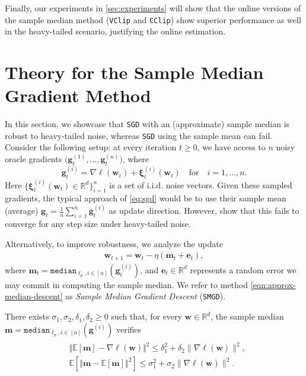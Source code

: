 \documentclass[10pt]{article} %
\renewcommand{\vec}[1]{\bm{#1}}
\newcommand{\bw}{\bm{w}}
\newcommand{\m}{\bm{m}}
\newcommand{\R}{\mathbb{R}}
\newcommand{\E}[1]{\mathbb{E}\left[#1\right] }
\newcommand{\samplemedian}[1]{\texttt{median}_{#1,i\in[n]}}
\newcommand{\SGD}{\texttt{SGD}}
\newcommand{\SMGD}{\texttt{SMGD}}
\newcommand{\VC}{\texttt{VClip}}
\newcommand{\CC}{\texttt{CClip}}
\begin{document}
Finally, our experiments in \cref{sec:experiments} will show that the online versions of the sample median method (\VC{} and \CC{}) show superior performance as well in the heavy-tailed scenario, justifying the online estimation. 


\section{Theory for the Sample Median Gradient Method}\label{sec:sample-median-methods}

In this section, we showcase that \SGD{} with an (approximate) sample median is robust to heavy-tailed noise, whereas \SGD{} using the sample mean can fail.
Consider the following setup: at every iteration $t \geq 0$, we have access to $n$ noisy oracle gradients $\big(\vec{g}_t^{(1)},\ldots,\vec{g}_t^{(n)}\big)$, where
\[  \vec{g}_t^{(i)} = \nabla \ell(\bw_t) + \vec{\xi}^{(i)}_t(\vec{w}_t) \quad \mbox{for} \quad  i=1,\dots, n.\] 
Here $\{\vec{\xi}^{(i)}_t(\vec{w}_t) \in \R^d \}_{i=1}^n$ is a set of  i.i.d. noise vectors. Given these sampled gradients, the typical approach of \ref{eq:sgd} would be to use their sample mean (average) $\vec{g}_t = \frac1{n} \sum_{i=1}^n \vec{g}_t^{(i)}$ as update direction. However, \citet[Remark 1]{zhang2020adaptive} show that this fails to converge for any step size under heavy-tailed noise.

Alternatively, to improve robustness, we analyze the update
\begin{align}\label{eqn:approx-median-descent}
    \vec{w}_{t+1} = \vec{w}_t - \eta (\vec{m}_t + \vec{e}_t), 
\end{align}
where $\vec{m}_t=\samplemedian{\ell_p}(\vec{g}_t^{(i)})$, and $\vec{e}_t\in \R^d$ represents a random error we may commit in computing the sample median. We refer to method \eqref{eqn:approx-median-descent} as \emph{Sample Median Gradient Descent} (\SMGD{}).

\vspace{1ex}

\begin{assumption}
\label{ass:uniform-bias-variance-bound-median}
    There exists $\sigma_1,\sigma_2,\delta_1, \delta_2\geq0$ such that, for every $\bw \in \mathbb{R}^d$, 
      the sample median $\m = \samplemedian{\ell_p}(\vec{g}^{(i)})$ verifies 
\begin{align}\label{ass:noise-approx-median}
    \begin{split}
    &\Vert \E{\vec{m}} - \nabla \ell(\vec{w}) \Vert^2 \leq \delta_1^2 + \delta_2 \|\nabla \ell(\bw)\|^2, \\
    &\E{ \Vert \vec{m} - \E{\vec{m}} \Vert^2  } \leq \sigma_1^2 + \sigma_2 \|\nabla \ell(\bw)\|^2.
    \end{split}
\end{align}
\end{assumption}
\end{document}
